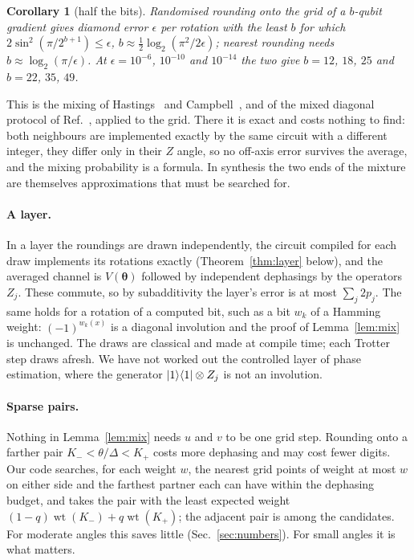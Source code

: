 \documentclass[aps,prx,twocolumn,superscriptaddress,nofootinbib,longbibliography]{revtex4-2}
\newtheorem{corollary}[theorem]{Corollary}
\theoremstyle{remark}
\newcommand{\wt}{\operatorname{wt}}
\begin{document}
\begin{corollary}[half the bits]\label{cor:bits}
Randomised rounding onto the grid of a $b$-qubit gradient gives diamond error $\epsilon$ per
rotation with the least $b$ for which $2\sin^2(\pi/2^{b+1})\le\epsilon$,
$b\approx\tfrac12\log_2(\pi^2/2\epsilon)$; nearest rounding needs
$b\approx\log_2(\pi/\epsilon)$. At $\epsilon=10^{-6}$, $10^{-10}$ and $10^{-14}$ the two give
$b=12$, $18$, $25$ and $b=22$, $35$, $49$.
\end{corollary}

This is the mixing of Hastings~\cite{Hastings2017} and Campbell~\cite{Campbell2017}, and of the
mixed diagonal protocol of Ref.~\cite{Kliuchnikov2023}, applied to the grid. There it is exact
and costs nothing to find: both neighbours are implemented exactly by the same circuit with a
different integer, they differ only in their $Z$ angle, so no off-axis error survives the
average, and the mixing probability is a formula. In synthesis the two ends of the mixture are
themselves approximations that must be searched for.

\paragraph*{A layer.} In a layer the roundings are drawn independently, the circuit compiled
for each draw implements its rotations exactly (Theorem~\ref{thm:layer} below), and the averaged
channel is $V(\boldsymbol\theta)$ followed by independent dephasings by the operators $Z_j$.
These commute, so by subadditivity the layer's error is at most $\sum_j2p_j$. The same holds for
a rotation of a computed bit, such as a bit $w_k$ of a Hamming weight: $(-1)^{w_k(x)}$ is a
diagonal involution and the proof of Lemma~\ref{lem:mix} is unchanged. The draws are classical
and made at compile time; each Trotter step draws afresh. We have not worked out the controlled
layer of phase estimation, where the generator $\ket1\!\bra1\otimes Z_j$ is not an involution.

\paragraph*{Sparse pairs.}
Nothing in Lemma~\ref{lem:mix} needs $u$ and $v$ to be one grid step. Rounding onto a farther
pair $K_-<\theta/\Delta<K_+$ costs more dephasing and may cost fewer digits. Our code searches,
for each weight $w$, the nearest grid points of weight at most $w$ on either side and the
farthest partner each can have within the dephasing budget, and takes the pair with the least
expected weight $(1-q)\wt(K_-)+q\wt(K_+)$; the adjacent pair is among the candidates. For
moderate angles this saves little (Sec.~\ref{sec:numbers}). For small angles it is what matters.
\end{document}
